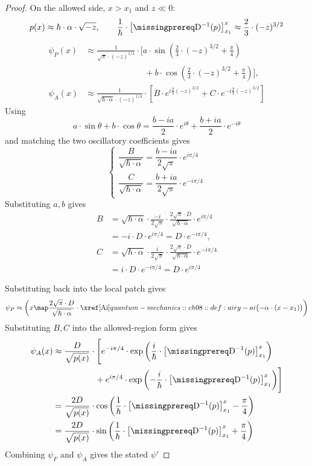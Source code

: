 \documentclass[12pt]{article}
\begin{document}
\begin{proof}
  On the allowed side, $x>x_1$ and $z\ll0$:
  \[
    p(x)\approx\hbar\cdot\alpha\cdot\sqrt{-z},
    \qquad
    \frac1\hbar\cdot\left[\DiffOp^{-1}(p)\right]_{x_1}^{x}
    \approx\frac23\cdot(-z)^{3/2}
  \]
  \[
    \begin{aligned}
      \psi_P(x)&\approx\frac1{\sqrt\pi\cdot(-z)^{1/4}}\cdot\Biggl[
        a\cdot\sin\left(\frac23\cdot(-z)^{3/2}+\frac\pi4\right)\\
        &\hspace{7em}+b\cdot\cos\left(\frac23\cdot(-z)^{3/2}+\frac\pi4\right)\Biggr],\\
      \psi_A(x)&\approx\frac1{\sqrt{\hbar\cdot\alpha}\cdot(-z)^{1/4}}\cdot\left[
        B\cdot e^{i\frac23(-z)^{3/2}}+C\cdot e^{-i\frac23(-z)^{3/2}}\right]
    \end{aligned}
  \]
  Using
  \[
    a\cdot\sin\theta+b\cdot\cos\theta
    =\frac{b-ia}{2}\cdot e^{i\theta}
    +\frac{b+ia}{2}\cdot e^{-i\theta}
  \]
  and matching the two oscillatory coefficients gives
  \[
    \begin{cases}
      \dfrac{B}{\sqrt{\hbar\cdot\alpha}}
        =\dfrac{b-ia}{2\sqrt\pi}\cdot e^{i\pi/4}\\[0.5em]
      \dfrac{C}{\sqrt{\hbar\cdot\alpha}}
        =\dfrac{b+ia}{2\sqrt\pi}\cdot e^{-i\pi/4}
    \end{cases}
  \]
  Substituting $a,b$ gives
  \[
    \begin{aligned}
      B&=\sqrt{\hbar\cdot\alpha}\cdot\frac{-i}{2\sqrt\pi}
        \cdot\frac{2\sqrt\pi\cdot D}{\sqrt{\hbar\cdot\alpha}}
        \cdot e^{i\pi/4}\\
       &=-i\cdot D\cdot e^{i\pi/4}=D\cdot e^{-i\pi/4},\\[0.5em]
      C&=\sqrt{\hbar\cdot\alpha}\cdot\frac{i}{2\sqrt\pi}
        \cdot\frac{2\sqrt\pi\cdot D}{\sqrt{\hbar\cdot\alpha}}
        \cdot e^{-i\pi/4}\\
       &=i\cdot D\cdot e^{-i\pi/4}=D\cdot e^{i\pi/4}
    \end{aligned}
  \]

  Substituting back into the local patch gives
  \[
    \psi_P\approx\left(x\map
      \frac{2\sqrt\pi\cdot D}{\sqrt{\hbar\cdot\alpha}}
      \cdot\AiryAi\bigl(-\alpha\cdot(x-x_1)\bigr)\right)
  \]
  Substituting $B,C$ into the allowed-region form gives
  \[
    \begin{aligned}
      \psi_A(x)&\approx\frac{D}{\sqrt{p(x)}}\cdot\Biggl[
        e^{-i\pi/4}\cdot\exp\left(\frac{i}{\hbar}\cdot
          \left[\DiffOp^{-1}(p)\right]_{x_1}^{x}\right)\\
        &\hspace{5em}+e^{i\pi/4}\cdot\exp\left(-\frac{i}{\hbar}\cdot
          \left[\DiffOp^{-1}(p)\right]_{x_1}^{x}\right)\Biggr]\\
      &=\frac{2D}{\sqrt{p(x)}}\cdot\cos\left(
        \frac1\hbar\cdot\left[\DiffOp^{-1}(p)\right]_{x_1}^{x}
        -\frac\pi4\right)\\
      &=\frac{2D}{\sqrt{p(x)}}\cdot\sin\left(
        \frac1\hbar\cdot\left[\DiffOp^{-1}(p)\right]_{x_1}^{x}
        +\frac\pi4\right)
    \end{aligned}
  \]
  Combining $\psi_F$ and $\psi_A$ gives the stated $\psi'$
\end{proof}
\end{document}
